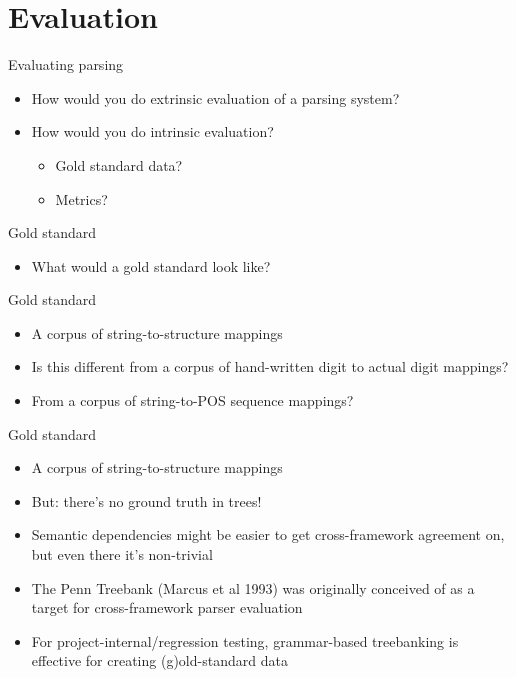 \documentclass{beamer}
\begin{document}
\section{Evaluation}

\begin{frame}{Evaluating parsing}
  \begin{itemize}
  \item How would you do extrinsic evaluation of a parsing system?
  \item How would you do intrinsic evaluation?
    \begin{itemize}
    \item Gold standard data?
    \item Metrics?
    \end{itemize}
  \end{itemize}
\end{frame}

\begin{frame}{Gold standard}
  \begin{itemize}
  \item What would a gold standard look like?
  \end{itemize}
\end{frame}

\begin{frame}{Gold standard}
  \begin{itemize}
  \item A corpus of string-to-structure mappings
  \item Is this different from a corpus of hand-written digit to actual digit mappings?
  \item From a corpus of string-to-POS sequence mappings?
  \end{itemize}
\end{frame}

\begin{frame}{Gold standard}
  \begin{itemize}
  \item A corpus of string-to-structure mappings
  \item But: there's no ground truth in trees!
  \item Semantic dependencies might be easier to get cross-framework
    agreement on, but even there it's non-trivial
  \item The Penn Treebank (Marcus et al 1993) was originally conceived
    of as a target for cross-framework parser evaluation
  \item For project-internal/regression testing, grammar-based
    treebanking is effective for creating (g)old-standard data
  \end{itemize}
\end{frame}
\end{document}
